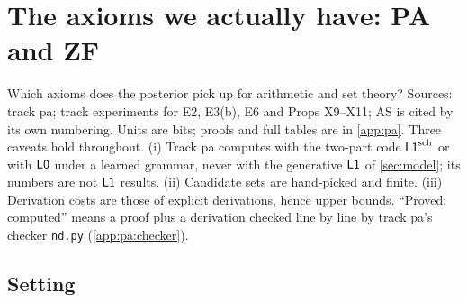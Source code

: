 \providecommand{\pabrk}{\hfil\penalty0\hfilneg}
\providecommand{\paR}[1]{\mathsf{R}_{#1}}

\section{The axioms we actually have: PA and ZF}\label{sec:pa}

Which axioms does the posterior pick up for arithmetic and set theory? Sources: track pa; track experiments for E2, E3(b), E6 and Props X9--X11; AS \citep{claude2026axiomschemas} is cited by its own numbering. Units are bits; proofs and full tables are in \cref{app:pa}. Three caveats hold throughout. (i) Track pa computes with the two-part code $\mathord{\mathsf{L1}}^{\mathrm{sch}}$ or with $\mathord{\mathsf{L0}}$ under a learned grammar, never with the generative $\mathord{\mathsf{L1}}$ of \cref{sec:model}; its numbers are not $\mathord{\mathsf{L1}}$ results. (ii) Candidate sets are hand-picked and finite. (iii) Derivation costs are those of explicit derivations, hence upper bounds. ``Proved; computed'' means a proof plus a derivation checked line by line by track pa's checker \texttt{nd.py} (\cref{app:pa:checker}).

\subsection{Setting}\label{sec:pa:setting}

